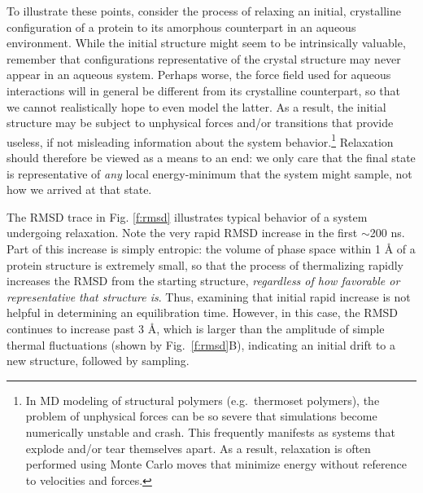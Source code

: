 To illustrate these points, consider the process of relaxing an initial, crystalline configuration of a protein to its amorphous counterpart in an aqueous environment.  While the initial structure might seem to be intrinsically valuable, remember that configurations representative of the crystal structure may never appear in an aqueous system.  Perhaps worse, the force field used for aqueous interactions will in general be different from its crystalline counterpart, so that we cannot realistically hope to even model the latter.  As a result, the initial structure may be subject to unphysical forces and/or transitions that provide useless, if not misleading information about the system behavior.\footnote{In MD modeling of structural polymers (e.g.\ thermoset polymers), the problem of unphysical forces can be so severe that simulations become numerically unstable and crash.  This frequently manifests as systems that explode and/or tear themselves apart.  As a result, relaxation is often performed using Monte Carlo moves that minimize energy without reference to velocities and forces.}  Relaxation should therefore be viewed as a means to an end: we only care that the final state is representative of {\it any} local energy-minimum that the system might sample, not how we arrived at that state.

The RMSD trace in Fig. \ref{f:rmsd} illustrates typical behavior of a system undergoing relaxation.  Note the very rapid RMSD increase in the first $\sim$200 ns. Part of this increase is simply entropic: the volume of phase space within 1 {\AA} of a protein structure is extremely small, so that the process of thermalizing rapidly increases the RMSD from the starting structure, \emph{regardless of how favorable or representative that structure is}.  Thus, examining that initial rapid increase is not helpful in determining an equilibration time.  However, in this case, the RMSD continues to increase past 3 {\AA}, which is larger than the amplitude of simple thermal fluctuations (shown by Fig.\ \ref{f:rmsd}B), indicating an initial drift to a new structure, followed by sampling.

